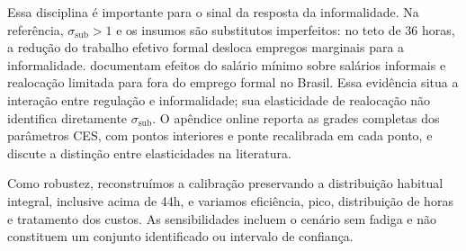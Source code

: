 Essa disciplina é importante para o sinal da resposta da informalidade. Na referência, $\sigma_{\mathrm{sub}}>1$ e os insumos são substitutos imperfeitos: no teto de 36 horas, a redução do trabalho efetivo formal desloca empregos marginais para a informalidade. \citet{DerenoncourtGerardLagosMontialoux2025} documentam efeitos do salário mínimo sobre salários informais e realocação limitada para fora do emprego formal no Brasil. Essa evidência situa a interação entre regulação e informalidade; sua elasticidade de realocação não identifica diretamente $\sigma_{\mathrm{sub}}$. O apêndice online reporta as grades completas dos parâmetros CES, com pontos interiores e ponte recalibrada em cada ponto, e discute a distinção entre elasticidades na literatura.

Como robustez, reconstruímos a calibração preservando a distribuição habitual integral, inclusive acima de 44h, e variamos eficiência, pico, distribuição de horas e tratamento dos custos. As sensibilidades incluem o cenário sem fadiga e não constituem um conjunto identificado ou intervalo de confiança.
